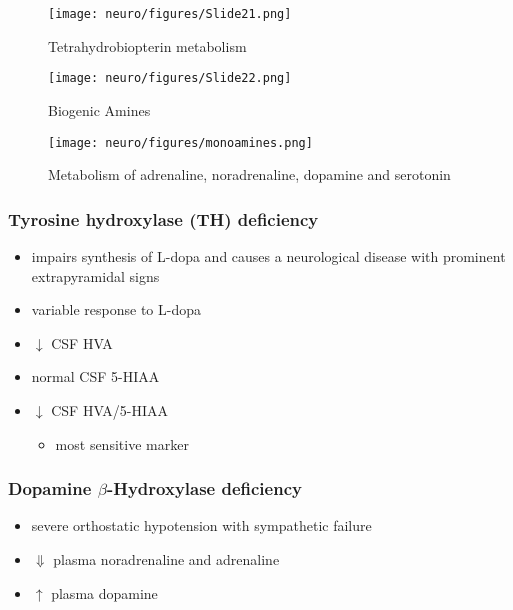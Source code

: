 \documentclass[12pt]{scrartcl}
\begin{document}
\begin{figure}[htbp]
\centering
\texttt{[image: neuro/figures/Slide21.png]}
\caption{\label{fig:org1dfba9d}Tetrahydrobiopterin metabolism}
\end{figure}

\begin{figure}[htbp]
\centering
\texttt{[image: neuro/figures/Slide22.png]}
\caption{\label{fig:orgb3f0e42}Biogenic Amines}
\end{figure}

\begin{figure}[htbp]
\centering
\texttt{[image: neuro/figures/monoamines.png]}
\caption{\label{fig:org9da4215}Metabolism of adrenaline, noradrenaline, dopamine and serotonin}
\end{figure}


\subsubsection{Tyrosine hydroxylase (TH) deficiency}
\label{sec:org18d77cb}
\begin{itemize}
\item impairs synthesis of L-dopa and causes a neurological disease with
prominent extrapyramidal signs
\item variable response to L-dopa
\item \(\downarrow\) CSF HVA
\item normal CSF 5-HIAA
\item \(\downarrow\) CSF HVA/5-HIAA
\begin{itemize}
\item most sensitive marker
\end{itemize}
\end{itemize}
\subsubsection{Dopamine \(\beta\)-Hydroxylase deficiency}
\label{sec:orgb38f8b5}
\begin{itemize}
\item severe orthostatic hypotension with sympathetic failure
\item \(\Downarrow\) plasma noradrenaline and adrenaline
\item \(\uparrow\) plasma dopamine
\end{itemize}
\end{document}
